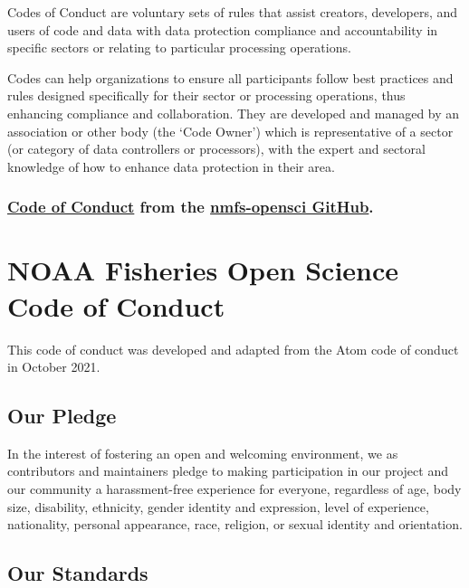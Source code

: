 \documentclass[
  letterpaper,
  oneside,
  open=any]{scrbook}
\begin{document}
Codes of Conduct are voluntary sets of rules that assist creators,
developers, and users of code and data with data protection compliance
and accountability in specific sectors or relating to particular
processing operations.

Codes can help organizations to ensure all participants follow best
practices and rules designed specifically for their sector or processing
operations, thus enhancing compliance and collaboration. They are
developed and managed by an association or other body (the `Code Owner')
which is representative of a sector (or category of data controllers or
processors), with the expert and sectoral knowledge of how to enhance
data protection in their area.

\subsection{\texorpdfstring{\href{https://github.com/nmfs-opensci/.github/blob/main/CODE_OF_CONDUCT.md}{Code
of Conduct} from the \href{https://nmfs-opensci.github.io/}{nmfs-opensci
GitHub}.}{Code of Conduct from the nmfs-opensci GitHub.}}\label{code-of-conduct-from-the-nmfs-opensci-github.}

\chapter{NOAA Fisheries Open Science Code of
Conduct}\label{noaa-fisheries-open-science-code-of-conduct}

This code of conduct was developed and adapted from the Atom code of
conduct in October 2021.

\section{Our Pledge}\label{our-pledge}

In the interest of fostering an open and welcoming environment, we as
contributors and maintainers pledge to making participation in our
project and our community a harassment-free experience for everyone,
regardless of age, body size, disability, ethnicity, gender identity and
expression, level of experience, nationality, personal appearance, race,
religion, or sexual identity and orientation.

\section{Our Standards}\label{our-standards}
\end{document}
